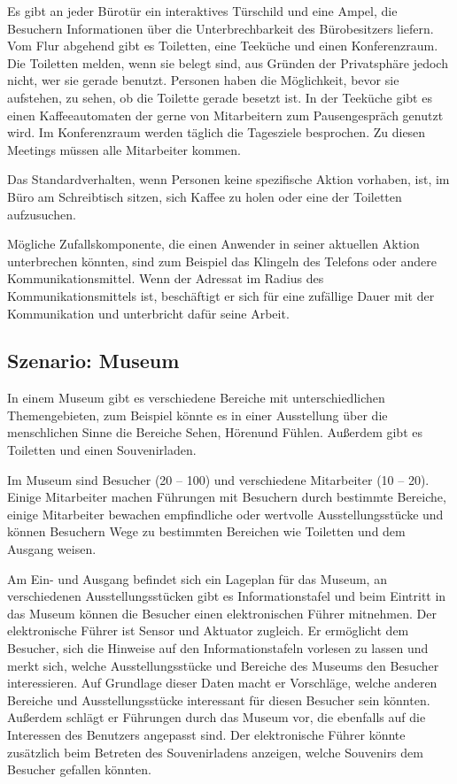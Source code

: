 Es gibt an jeder Bürotür ein interaktives Türschild und eine Ampel, die Besuchern Informationen über die Unterbrechbarkeit des Bürobesitzers liefern.
Vom Flur abgehend gibt es Toiletten, eine Teeküche und einen Konferenzraum. Die Toiletten melden, wenn sie belegt sind, aus Gründen der Privatsphäre jedoch nicht, wer sie gerade benutzt. Personen haben die Möglichkeit, bevor sie aufstehen, zu sehen, ob die Toilette gerade besetzt ist. In der Teeküche gibt es einen Kaffeeautomaten der gerne von Mitarbeitern zum Pausengespräch genutzt wird. Im Konferenzraum werden täglich die Tagesziele besprochen. Zu diesen Meetings müssen alle Mitarbeiter kommen.

Das Standardverhalten, wenn Personen keine spezifische Aktion vorhaben, ist, im Büro am Schreibtisch sitzen, sich Kaffee zu holen oder eine der Toiletten aufzusuchen.

Mögliche Zufallskomponente, die einen Anwender in seiner aktuellen Aktion unterbrechen könnten, sind zum Beispiel das Klingeln des Telefons oder andere Kommunikationsmittel. Wenn der Adressat im Radius des Kommunikationsmittels ist, beschäftigt er sich für eine zufällige Dauer mit der Kommunikation und unterbricht dafür seine Arbeit.

\subsection*{Szenario: Museum}
 
In einem Museum gibt es verschiedene Bereiche mit unterschiedlichen Themengebieten, zum Beispiel könnte es in einer Ausstellung über die menschlichen Sinne die Bereiche \glqq Sehen\grqq , \glqq Hören\grqq und \glqq Fühlen\grqq. Außerdem gibt es Toiletten und einen Souvenirladen.

Im Museum sind Besucher (20 – 100) und verschiedene Mitarbeiter (10 – 20). Einige Mitarbeiter machen Führungen mit Besuchern durch bestimmte Bereiche, einige Mitarbeiter bewachen empfindliche oder wertvolle Ausstellungsstücke und können Besuchern Wege zu bestimmten Bereichen wie Toiletten und dem Ausgang weisen.

Am Ein- und Ausgang befindet sich ein Lageplan für das Museum, an verschiedenen Ausstellungsstücken gibt es Informationstafel und beim Eintritt in das Museum können die Besucher einen elektronischen Führer mitnehmen. Der elektronische Führer ist Sensor und Aktuator zugleich. Er ermöglicht dem Besucher, sich die Hinweise auf den Informationstafeln vorlesen zu lassen und merkt sich, welche Ausstellungsstücke und Bereiche des Museums den Besucher interessieren. Auf Grundlage dieser Daten macht er Vorschläge, welche anderen Bereiche und Ausstellungsstücke interessant für diesen Besucher sein könnten. Außerdem schlägt er Führungen durch das Museum vor, die ebenfalls auf die Interessen des Benutzers angepasst sind. Der elektronische Führer könnte zusätzlich beim Betreten des Souvenirladens anzeigen, welche Souvenirs dem Besucher gefallen könnten.

